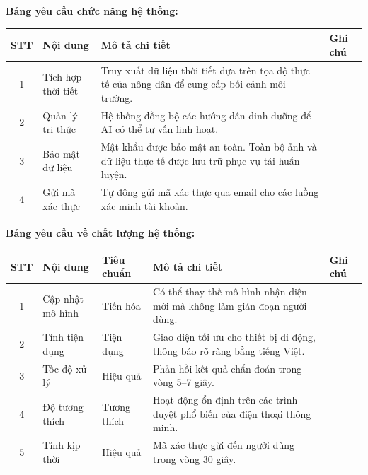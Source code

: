 \documentclass[12pt,a4paper]{article}
\begin{document}
\textbf{Bảng yêu cầu chức năng hệ thống:}
\begin{longtable}{|c|p{3.5cm}|p{8.5cm}|p{1cm}|}
\hline
\rowcolor{headerblue}
\textbf{STT} & \textbf{Nội dung} & \textbf{Mô tả chi tiết} & \textbf{Ghi chú} \\
\hline
\endhead
1 & Tích hợp thời tiết & Truy xuất dữ liệu thời tiết dựa trên tọa độ thực tế của nông dân để cung cấp bối cảnh môi trường. & \\
\hline
2 & Quản lý tri thức & Hệ thống đồng bộ các hướng dẫn dinh dưỡng để AI có thể tư vấn linh hoạt. & \\
\hline
3 & Bảo mật dữ liệu & Mật khẩu được bảo mật an toàn. Toàn bộ ảnh và dữ liệu thực tế được lưu trữ phục vụ tái huấn luyện. & \\
\hline
4 & Gửi mã xác thực & Tự động gửi mã xác thực qua email cho các luồng xác minh tài khoản. & \\
\hline
\end{longtable}

\textbf{Bảng yêu cầu về chất lượng hệ thống:}
\begin{longtable}{|c|p{3cm}|p{2cm}|p{6cm}|p{1cm}|}
\hline
\rowcolor{headerblue}
\textbf{STT} & \textbf{Nội dung} & \textbf{Tiêu chuẩn} & \textbf{Mô tả chi tiết} & \textbf{Ghi chú} \\
\hline
\endhead
1 & Cập nhật mô hình & Tiến hóa & Có thể thay thế mô hình nhận diện mới mà không làm gián đoạn người dùng. & \\
\hline
2 & Tính tiện dụng & Tiện dụng & Giao diện tối ưu cho thiết bị di động, thông báo rõ ràng bằng tiếng Việt. & \\
\hline
3 & Tốc độ xử lý & Hiệu quả & Phản hồi kết quả chẩn đoán trong vòng 5--7 giây. & \\
\hline
4 & Độ tương thích & Tương thích & Hoạt động ổn định trên các trình duyệt phổ biến của điện thoại thông minh. & \\
\hline
5 & Tính kịp thời & Hiệu quả & Mã xác thực gửi đến người dùng trong vòng 30 giây. & \\
\hline
\end{longtable}
\end{document}
